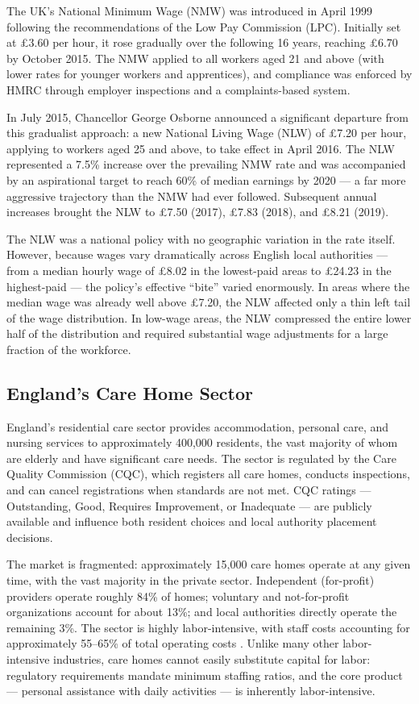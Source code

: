 \documentclass[12pt]{article}
\begin{document}
The UK's National Minimum Wage (NMW) was introduced in April 1999 following the recommendations of the Low Pay Commission (LPC). Initially set at \pounds3.60 per hour, it rose gradually over the following 16 years, reaching \pounds6.70 by October 2015. The NMW applied to all workers aged 21 and above (with lower rates for younger workers and apprentices), and compliance was enforced by HMRC through employer inspections and a complaints-based system.

In July 2015, Chancellor George Osborne announced a significant departure from this gradualist approach: a new National Living Wage (NLW) of \pounds7.20 per hour, applying to workers aged 25 and above, to take effect in April 2016. The NLW represented a 7.5\% increase over the prevailing NMW rate and was accompanied by an aspirational target to reach 60\% of median earnings by 2020 --- a far more aggressive trajectory than the NMW had ever followed. Subsequent annual increases brought the NLW to \pounds7.50 (2017), \pounds7.83 (2018), and \pounds8.21 (2019).

The NLW was a national policy with no geographic variation in the rate itself. However, because wages vary dramatically across English local authorities --- from a median hourly wage of \pounds8.02 in the lowest-paid areas to \pounds24.23 in the highest-paid --- the policy's effective ``bite'' varied enormously. In areas where the median wage was already well above \pounds7.20, the NLW affected only a thin left tail of the wage distribution. In low-wage areas, the NLW compressed the entire lower half of the distribution and required substantial wage adjustments for a large fraction of the workforce.

\subsection{England's Care Home Sector}

England's residential care sector provides accommodation, personal care, and nursing services to approximately 400,000 residents, the vast majority of whom are elderly and have significant care needs. The sector is regulated by the Care Quality Commission (CQC), which registers all care homes, conducts inspections, and can cancel registrations when standards are not met. CQC ratings --- Outstanding, Good, Requires Improvement, or Inadequate --- are publicly available and influence both resident choices and local authority placement decisions.

The market is fragmented: approximately 15,000 care homes operate at any given time, with the vast majority in the private sector. Independent (for-profit) providers operate roughly 84\% of homes; voluntary and not-for-profit organizations account for about 13\%; and local authorities directly operate the remaining 3\%. The sector is highly labor-intensive, with staff costs accounting for approximately 55--65\% of total operating costs \citep{laing2020care}. Unlike many other labor-intensive industries, care homes cannot easily substitute capital for labor: regulatory requirements mandate minimum staffing ratios, and the core product --- personal assistance with daily activities --- is inherently labor-intensive.
\end{document}
